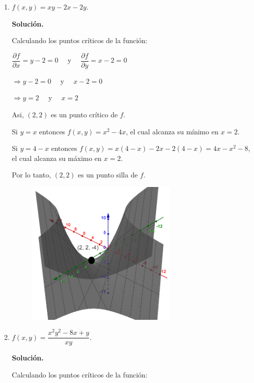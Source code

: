 \documentclass[fleqn, 12pt]{article}
\newcommand{\derivadaparcial}[2]{\dfrac{\partial {#1}}{\partial {#2}}}
\begin{document}
\begin{enumerate}
\begin{enumerate}
            \item $ f(x,y) = xy - 2x - 2y $.
            
            \textbf{Solución.}

            Calculando los puntos críticos de la función:

            $ \derivadaparcial{f}{x} = y - 2 = 0 \quad $ y $ \quad \derivadaparcial{f}{y} = x - 2 = 0 $

            $ \Longrightarrow y - 2 = 0 \quad $ y $ \quad x - 2 = 0 $

            $ \Longrightarrow y = 2 \quad $ y $ \quad x = 2 $

            Asi, $ (2,2) $ es un punto crítico de $ f $.

            Si $ y = x $ entonces $ f(x,y) = x^2 - 4x $, el cual alcanza su mínimo en $ x = 2 $.

            Si $ y = 4 - x $ entonces $ f(x,y) = x(4-x) - 2x - 2(4-x) = 4x - x^2 - 8 $, el cual alcanza su máximo en $ x = 2 $.

            Por lo tanto, $ (2,2) $ es un punto silla de $ f $.

            \begin{figure}[h]
                \centering
                \includegraphics[height = 7cm]{Segundo.png}
            \end{figure}

            \item $ f(x,y) = \dfrac{x^2 y^2 - 8x + y}{xy} $.
            
            \textbf{Solución.}

            Calculando los puntos críticos de la función:


\end{enumerate}
\end{enumerate}
\end{document}
